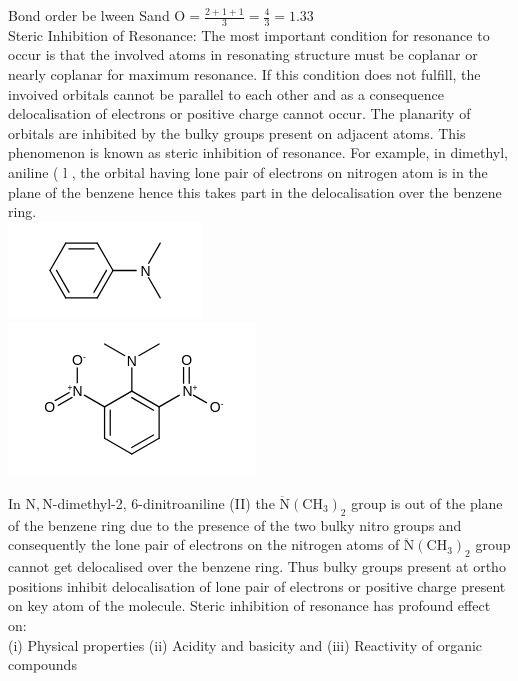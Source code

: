 \documentclass[10pt]{article}
\begin{document}
Bond order be lween Sand $\mathrm{O}=\frac{2+1+1}{3}=\frac{4}{3}=1.33$\\
Steric Inhibition of Resonance: The most important condition for resonance to occur is that the involved atoms in resonating structure must be coplanar or nearly coplanar for maximum resonance. If this condition does not fulfill, the invoived orbitals cannot be parallel to each other and as a consequence delocalisation of electrons or positive charge cannot occur. The planarity of orbitals are inhibited by the bulky groups present on adjacent atoms. This phenomenon is known as steric inhibition of resonance. For example, in dimethyl, aniline ( l , the orbital having lone pair of electrons on nitrogen atom is in the plane of the benzene hence this takes part in the delocalisation over the benzene ring.\\
\includegraphics{smile-bac49b3fe39b9dc99935503baaa0c0cea7ab00fe}\\
\includegraphics{smile-c1971e259c359d09db02df9242477b1da352db9f}

In $\mathrm{N}, \mathrm{N}$-dimethyl-2, 6-dinitroaniline (II) the $\ddot{\mathrm{N}}\left(\mathrm{CH}_{3}\right)_{2}$ group is out of the plane of the benzene ring due to the presence of the two bulky nitro groups and consequently the lone pair of electrons on the nitrogen atoms of $\ddot{\mathrm{N}}\left(\mathrm{CH}_{3}\right)_{2}$ group cannot get delocalised over the benzene ring. Thus bulky groups present at ortho positions inhibit delocalisation of lone pair of electrons or positive charge present on key atom of the molecule. Steric inhibition of resonance has profound effect on:\\
(i) Physical properties (ii) Acidity and basicity and (iii) Reactivity of organic compounds
\end{document}
